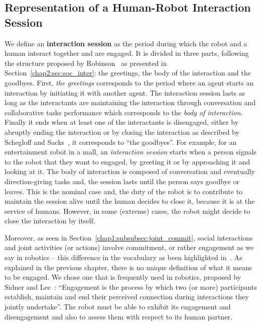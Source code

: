 \documentclass[a4paper,11pt,twoside]{StyleThese}
\begin{document}
\subsection{Representation of a Human-Robot Interaction Session}
We define an \textbf{interaction session} as the period during which the robot and a human interact together and are engaged. It is divided in three parts, following the structure proposed by Robinson~\cite{robinson_overall_2012} as presented in Section~\ref{chap2:sec:soc_inter}: the greetings, the body of the interaction and the goodbyes. First, \textit{the greetings} corresponds to the period where an agent starts an interaction by initiating it with another agent. The interaction session lasts as long as the interactants are maintaining the interaction through conversation and collaborative tasks performance which corresponds to the \textit{body of interaction}. Finally it ends when at least one of the interactants is disengaged, either by abruptly ending the interaction or by closing the interaction as described by Schegloff and Sacks~\cite{schegloff_1973_opening}, it corresponds to ``the goodbyes''. For example, for an entertainment robot in a mall, an \textit{interaction session} starts when a person signals to the robot that they want to engaged, by greeting it or by approaching it and looking at it. The body of interaction is composed of conversation and eventually direction-giving tasks and, the session lasts until the person says goodbye or leaves. This is the nominal case and, the duty of the robot is to contribute to maintain the session alive until the human decides to close it, because it is at the service of humans. However, in some (extreme) cases, the robot might decide to close the interaction by itself.

Moreover, as seen in Section~\ref{chap1:subsubsec:joint_commit}, social interactions and joint activities (or actions) involve commitment, or rather engagement as we say in robotics -- this difference in the vocabulary as been highlighted in~\cite{castro_2019_commitments}. As explained in the previous chapter, there is no unique definition of what it means to be engaged. We chose one that is frequently used in robotics, proposed by Sidner and Lee~\cite{sidner_2003_engagement}: ``Engagement is the process by which two (or more) participants establish, maintain and end their perceived connection during interactions they jointly undertake''. The robot must be able to exhibit its engagement and disengagement and also to assess them with respect to its human partner.
\end{document}

